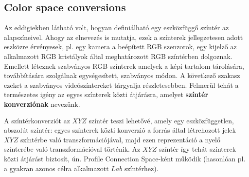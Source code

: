 \subsection{Color space conversions}
Az eddigiekben látható volt, hogyan definiálható egy eszközfüggő színtér az alapszíneivel.
Ahogy az elnevezés is mutatja, ezek a színterek jellegzetesen adott eszközre érvényesek, pl. egy kamera a beépített RGB szenzorok, egy kijelző az alkalmazott RGB kristályok által meghatározott RGB színtérben dolgoznak.
Emellett léteznek szabványos RGB színterek amelyek a képi tartalom tárolására, továbbítására szolgálnak egységesített, szabványos módon.
A következő szakasz ezeket a szabványos videószíntereket tárgyalja részletesebben.
Felmerül tehát a természetes igény az egyes színterek közti átjárásra, amelyet \textbf{színtér konverziónak} nevezünk.

A színtérkonverziót az $XYZ$ színtér teszi lehetővé, amely egy eszközfüggetlen, abszolút színtér:
egyes színterek közti konverzió a forrás által létrehozott jelek $XYZ$ színtérbe való transzformációjával, majd ezen reprezentáció a nyelő színterébe való transzformációval történik.
Az $XYZ$ színtér így tehát színterek közti átjárást biztosít, ún. Profile Connection Space-ként működik (hasonlóan pl. a gyakran azonos célra alkalmazott $Lab$ színtérhez).

